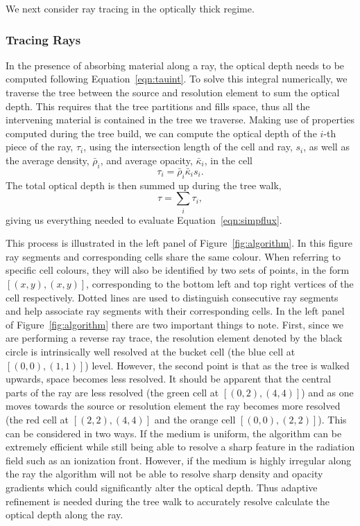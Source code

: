 \documentclass[fleq,usenatbib]{mnras}
\begin{document}
{We next consider ray tracing in the optically thick regime.

\subsubsection{Tracing Rays}
In the presence of absorbing material along a ray, the optical depth needs to 
be computed following
Equation~\ref{eqn:tauint}. To solve this integral numerically, we traverse 
the tree between the source and resolution element to sum the optical 
depth. This requires that the tree partitions and fills space, thus all 
the intervening material is contained in the tree we traverse. Making 
use of properties computed during the tree build, we can compute the optical 
depth of the $i$-th piece of the ray, $\tau_i$, using the intersection length 
of the cell and ray, $s_i$, as well as the average density, $\bar{\rho}_i$, 
and average opacity, $\bar{\kappa}_i$, in the cell
\begin{equation}
\label{eqn:taui}
\tau_i = \bar{\rho}_i \bar{\kappa}_i s_i.
\end{equation}
The total optical depth is then summed up during the tree walk,
\begin{equation}
\label{eqn:tausum}
\tau = \sum_i \tau_i,
\end{equation}
giving us everything needed to evaluate Equation~\ref{eqn:simpflux}. 

This process is illustrated in the left panel of Figure~\ref{fig:algorithm}. 
In this figure ray segments and corresponding cells share 
the same colour. When referring to specific cell colours, they will also be 
identified by two sets of points, in the form $[(x,y),(x,y)]$, corresponding 
to the bottom left and top right vertices of the cell respectively. Dotted 
lines are used to distinguish consecutive ray segments and help associate ray 
segments with their corresponding cells. In the left panel of 
Figure~\ref{fig:algorithm} there are two important things to note. First, 
since we are performing a reverse ray trace, the resolution element denoted by 
the black circle is intrinsically well resolved at the bucket cell (the blue 
cell at $[(0,0),(1,1)]$) level. However, the second point is that as the tree 
is walked upwards, space becomes less resolved. It should be apparent that the 
central parts of the ray are less resolved (the green cell at $[(0,2),(4,4)]$) 
and as one moves towards the source or resolution element the ray becomes more 
resolved (the red cell at $[(2,2),(4,4)]$ and the orange cell 
$[(0,0),(2,2)]$). This can be considered in two ways. If the medium is 
uniform, the algorithm can be extremely efficient while still being able to 
resolve a sharp feature in the radiation field such as an ionization front. 
However, if the medium is highly irregular along the ray the algorithm will 
not be able to resolve sharp density and opacity gradients which could 
significantly alter the optical depth. Thus adaptive refinement is needed 
during the tree walk to accurately resolve calculate the optical depth along the ray.

}
\end{document}
